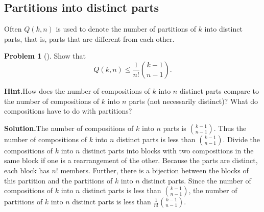 \documentclass[10pt,]{book}
\theoremstyle{plain}
\theoremstyle{definition}
\newtheorem{activity}[project]{Problem}
\theoremstyle{definition}
\numberwithin{equation}{chapter}
\begin{document}
\subsection[{Partitions into distinct parts}]{Partitions into distinct parts}\label{subsection-33}
Often \(Q(k,n)\) is used to denote the number of partitions of \(k\) into distinct parts, that is, parts that are different from each other.%
\begin{activity}[]\label{activity-172}
Show that%
\begin{equation*}
Q(k,n) \le \frac{1}{n!}\binom{k-1}{n-1}.
\end{equation*}
%
\par\medskip\noindent%
\textbf{Hint.}\quad How does the number of compositions of \(k\) into \(n\) distinct parts compare to the number of compositions of \(k\) into \(n\) parts (not necessarily distinct)? What do compositions have to do with partitions?%
\par\medskip\noindent%
\textbf{Solution.}\quad The number of compositions of \(k\) into \(n\) parts is \(\binom{k-1}{n-1}\). Thus the number of compositions of \(k\) into \(n\) distinct parts is less than \(\binom{k-1}{n-1}\). Divide the compositions of \(k\) into \(n\) distinct parts into blocks with two compositions in the same block if one is a rearrangement of the other. Because the parts are distinct, each block has \(n!\) members. Further, there is a bijection between the blocks of this partition and the partitions of \(k\) into \(n\) distinct parts. Since the number of compositions of \(k\) into \(n\) distinct parts is less than \(\binom{k-1}{n-1}\), the number of partitions of \(k\) into \(n\) distinct parts is less than \(\frac{1}{n!}  \binom{k-1}{n-1}\).%
\end{activity}
\end{document}
